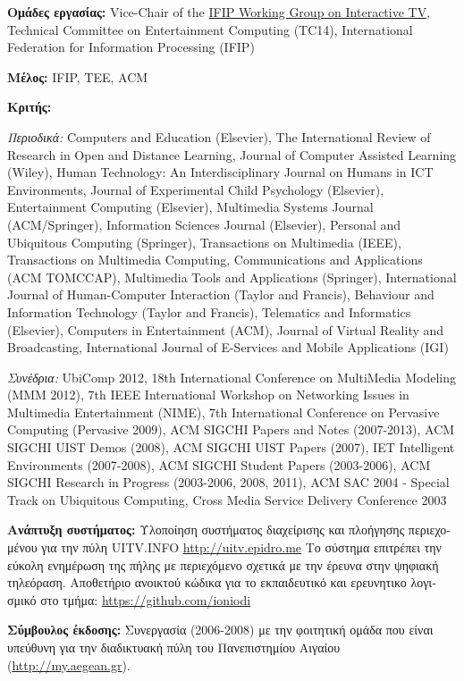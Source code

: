 \documentclass[11pt, a4paper]{article}
\begin{document}
\begin{greek}
\textbf{Ομάδες εργασίας:} Vice-Chair of the
\href{http://www.ifip.org/bulletin/bulltcs/memtc14.htm\#WG146}{IFIP
Working Group on Interactive TV}, Technical Committee on Entertainment
Computing (TC14), International Federation for Information Processing
(IFIP)

\textbf{Μέλος:} IFIP, TEE, ACM

\textbf{Κριτής:}

\emph{Περιοδικά:} Computers and Education (Elsevier), The International
Review of Research in Open and Distance Learning, Journal of Computer
Assisted Learning (Wiley), Human Technology: An Interdisciplinary
Journal on Humans in ICT Environments, Journal of Experimental Child
Psychology (Elsevier), Entertainment Computing (Elsevier), Multimedia
Systems Journal (ACM/Springer), Information Sciences Journal (Elsevier),
Personal and Ubiquitous Computing (Springer), Transactions on Multimedia
(IEEE), Transactions on Multimedia Computing, Communications and
Applications (ACM TOMCCAP), Multimedia Tools and Applications
(Springer), International Journal of Human-Computer Interaction (Taylor
and Francis), Behaviour and Information Technology (Taylor and Francis),
Telematics and Informatics (Elsevier), Computers in Entertainment (ACM),
Journal of Virtual Reality and Broadcasting, International Journal of
E-Services and Mobile Applications (IGI)

\emph{Συνέδρια:} UbiComp 2012, 18th International Conference on
MultiMedia Modeling (MMM 2012), 7th IEEE International Workshop on
Networking Issues in Multimedia Entertainment (NIME),
7th International Conference on Pervasive Computing (Pervasive 2009),
ACM SIGCHI Papers and Notes (2007-2013), ACM SIGCHI UIST Demos (2008),
ACM SIGCHI UIST Papers (2007), IEΤ Intelligent Environments (2007-2008),
ACM SIGCHI Student Papers (2003-2006), ACM SIGCHI Research in Progress
(2003-2006, 2008, 2011), ACM SAC 2004 - Special Track on Ubiquitous
Computing, Cross Media Service Delivery Conference 2003

\textbf{Ανάπτυξη συστήματος:} Υλοποίηση συστήματος διαχείρισης και
πλοήγησης περιεχομένου για την πύλη UITV.INFO
\href{http://uitv.epidro.me}{\ul{http://uitv.epidro.me}} Το σύστημα
επιτρέπει την εύκολη ενημέρωση της πήλης με περιεχόμενο σχετικά με την
έρευνα στην ψηφιακή τηλεόραση. Αποθετήριο ανοικτού κώδικα για το
εκπαιδευτικό και ερευνητικο λογισμικό στο τμήμα:
\href{https://github.com/ioniodi}{\ul{https://github.com/ioniodi}}

\textbf{Σύμβουλος έκδοσης:} Συνεργασία (2006-2008) με την φοιτητική
ομάδα που είναι υπεύθυνη για την διαδικτυακή πύλη του Πανεπιστημίου
Αιγαίου (\href{http://my.aegean.gr/}{\ul{http://my.aegean.gr}}).


\end{greek}
\end{document}
